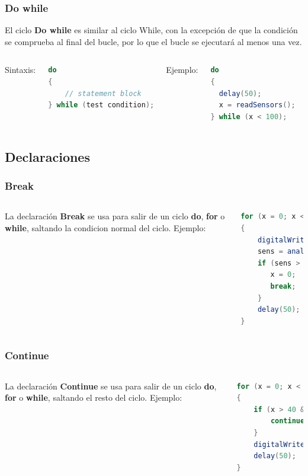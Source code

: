 \documentclass{beamer}
\begin{document}
\begin{frame}[fragile]
\frametitle{Do while}
El ciclo \textbf{Do while} es similar al ciclo While, con la excepción de que la condición se comprueba al final del bucle, por lo que el bucle se ejecutará al menos una vez.
\vspace{0.1in}
\begin{columns}[c]
Sintaxis:\\
\begin{lstlisting}[language=java]
do
{
    // statement block
} while (test condition);
\end{lstlisting}
Ejemplo:
\begin{lstlisting}[language=java]
do
{
  delay(50);          
  x = readSensors();
} while (x < 100);
\end{lstlisting}
\end{columns}
\end{frame}

\subsection{Declaraciones}

\begin{frame}[fragile]
\frametitle{Break}
\begin{columns}[c]
La declaración \textbf{Break} se usa para salir de un ciclo \textbf{do}, \textbf{for} o \textbf{while}, saltando la condicion normal del ciclo.
Ejemplo:
\begin{lstlisting}[language=java]
for (x = 0; x < 255; x ++)
{
    digitalWrite(PWMpin, x);
    sens = analogRead(0);  
    if (sens > threshold){
       x = 0;
       break;
    }  
    delay(50);
}
\end{lstlisting}
\end{columns}
\end{frame}

\begin{frame}[fragile]
\frametitle{Continue}
\begin{columns}[c]
La declaración \textbf{Continue} se usa para salir de un ciclo \textbf{do}, \textbf{for} o \textbf{while}, saltando el resto del ciclo.
Ejemplo:
\begin{lstlisting}[language=java]
for (x = 0; x < 255; x ++)
{
    if (x > 40 && x < 120){
        continue;
    }
    digitalWrite(PWMpin, x);
    delay(50);
}
\end{lstlisting}
\end{columns}
\end{frame}
\end{document}
